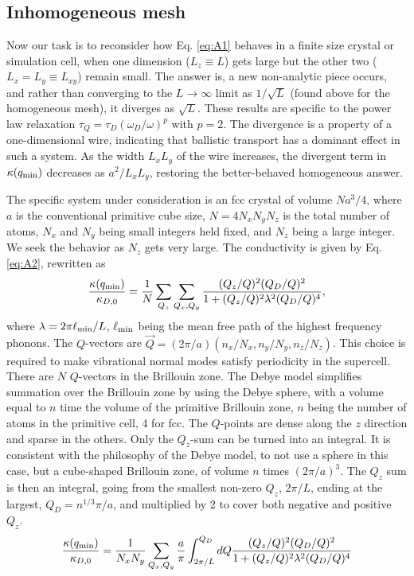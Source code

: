 \documentclass[aps,prb,twocolumn,showpacs,superscriptaddress]{revtex4-1}\begin{tiny}\end{tiny}
\begin{document}
{\begin{appendix}
\section{Inhomogeneous mesh}
%
%

Now our task is to reconsider how Eq. \ref{eq:A1} behaves in a finite size crystal or simulation cell,
when one dimension ($L_z\equiv L$) gets large but the other two ($L_x = L_y \equiv L_{xy}$)
remain small.  The answer is, a new non-analytic piece occurs, and rather than converging
to the $L\rightarrow \infty$ limit as $1/\sqrt{L}$ (found above for the homogeneous mesh), it
diverges as $\sqrt{L}$.  These results are specific to the power law relaxation 
$\tau_Q=\tau_D(\omega_D/\omega)^p$ with $p=2$.  The divergence is a property of a one-dimensional
wire, indicating that ballistic transport has a dominant effect in such a system.
As the width $L_x L_y$ of the wire increases, the divergent term in $\kappa(q_{\rm min})$
decreases as $a^2/L_x L_y$, restoring the better-behaved homogeneous answer.

The specific system under consideration is an fcc crystal of volume $Na^3 /4$, where
$a$ is the conventional primitive cube size, $N=4N_x N_y N_z$ is the total number of
atoms, $N_x$ and $N_y$ being small integers held fixed, and $N_z$ being a large
integer.  We seek the behavior as $N_z$ gets very large.
The conductivity is given by Eq. \ref{eq:A2}, rewritten as 
%
\begin{equation}
\frac{\kappa(q_{\rm min})}{\kappa_{D,0}}=\frac{1}{N} \sum_{Q_z} \sum_{Q_x,Q_y} 
 \frac{ (Q_z/Q)^2 (Q_D/Q)^2 } {  1 +(Q_z/Q)^2  \lambda^2 (Q_D/Q)^4  },
\label{eq:B1}
\end{equation}
%
where $\lambda=2\pi\ell_{\rm min}/L$, $\ell_{\rm min}$ being the mean free path of the 
highest frequency phonons.
The $Q$-vectors are $\vec{Q}=(2\pi/a)(n_x/N_x,n_y/N_y,n_z/N_z)$.  This choice is required
to make vibrational normal modes satisfy periodicity in the supercell.  There are
$N$ $Q$-vectors in the Brillouin zone.
The Debye model simplifies summation over the Brillouin zone by using the Debye
sphere, with a volume equal to $n$ time the volume of the primitive Brillouin zone, $n$
being the number of atoms in the primitive cell, 4 for fcc.  The $Q$-points are
dense along the $z$ direction and sparse in the others.  Only the $Q_z$-sum
can be turned into an integral.  It is consistent with the philosophy of the Debye
model, to not use a sphere in this case, but a cube-shaped Brillouin zone, of 
volume $n$ times $(2\pi/a)^3$.  The $Q_z$ sum is then an integral, going from the smallest
non-zero $Q_z$, $2\pi/L$, ending at the largest, $Q_D=n^{1/3}\pi/a$, and multiplied by 2
to cover both negative and positive $Q_z$.  
%
\begin{equation}
\frac{\kappa(q_{\rm min})}{\kappa_{D,0}}=\frac{1}{N_x N_y} 
\sum_{Q_x,Q_y} \frac{a}{\pi}\int_{2\pi/L}^{Q_D} dQ
 \frac{ (Q_z/Q)^2 (Q_D/Q)^2 } {  1 +(Q_z/Q)^2  \lambda^2 (Q_D/Q)^4  }
\label{eq:B2}
\end{equation}
%


\end{appendix}}
\end{document}
